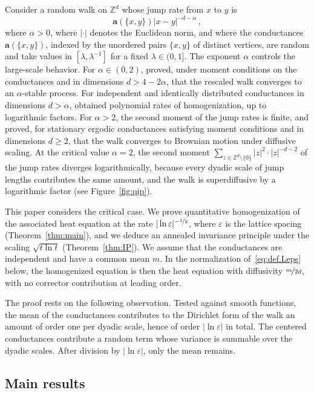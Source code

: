 \documentclass[11pt]{amsart}
\numberwithin{equation}{section}
\newcommand{\Z}{\mathbb{Z}}
\newcommand{\ba}{\mathbf{a}}
\newcommand{\eps}{\varepsilon}
\newcommand{\nf}{\nicefrac}
\begin{document}
Consider a random walk on $\Z^d$ whose jump rate from $x$ to $y$ is
\begin{equation} \label{eq:jump.rates}
    \ba(\{x,y\}) |x - y|^{-d-\alpha}\,,
\end{equation}
where $\alpha > 0$, where $|\cdot|$ denotes the Euclidean norm, and where the conductances $\ba(\{x,y\})$, indexed by the unordered pairs $\{x,y\}$ of distinct vertices, are random and take values in $[\lambda, \lambda^{-1}]$ for a fixed $\lambda \in (0,1]$.
The exponent $\alpha$ controls the large-scale behavior.
For $\alpha \in (0,2)$, \citet*{CKW2021} proved, under moment conditions on the conductances and in dimensions $d > 4 - 2\alpha$, that the rescaled walk converges to an $\alpha$-stable process.
For independent and identically distributed conductances in dimensions $d > \alpha$, \citet*{CCKW2025} obtained polynomial rates of homogenization, up to logarithmic factors.
For $\alpha > 2$, the second moment of the jump rates is finite, and \citet*{BCKW2021} proved, for stationary ergodic conductances satisfying moment conditions and in dimensions $d \geq 2$, that the walk converges to Brownian motion under diffusive scaling.
At the critical value $\alpha = 2$, the second moment $\sum_{z \in \Z^d \setminus \{0\}} |z|^2 \cdot |z|^{-d-2}$ of the jump rates diverges logarithmically, because every dyadic scale of jump lengths contributes the same amount, and the walk is superdiffusive by a logarithmic factor (see Figure~\ref{fig:qip}).

This paper considers the critical case.
We prove quantitative homogenization of the associated heat equation at the rate $|\ln \eps|^{-\nf12}$, where $\eps$ is the lattice spacing (Theorem~\ref{thm:main}), and we deduce an annealed invariance principle under the scaling $\sqrt{t \ln t}$ (Theorem~\ref{thm:IP}).
We assume that the conductances are independent and have a common mean $m$.
In the normalization of~\eqref{eq:def.Leps} below, the homogenized equation is then the heat equation with diffusivity $\nf{m}{2d}$, with no corrector contribution at leading order.

The proof rests on the following observation.
Tested against smooth functions, the mean of the conductances contributes to the Dirichlet form of the walk an amount of order one per dyadic scale, hence of order $|\ln \eps|$ in total.
The centered conductances contribute a random term whose variance is summable over the dyadic scales.
After division by $|\ln \eps|$, only the mean remains.

\subsection{Main results}
\end{document}
